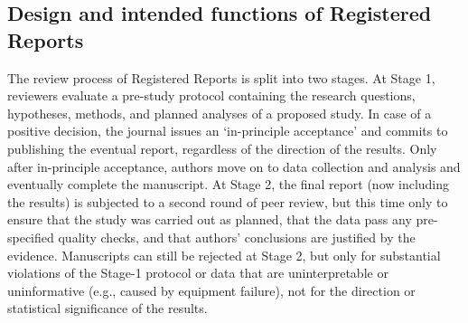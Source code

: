 \documentclass[
  ,man,mask,floatsintext]{apa6}
\begin{document}
\hypertarget{design-and-intended-functions-of-registered-reports}{%
\subsection{Design and intended functions of Registered Reports}\label{design-and-intended-functions-of-registered-reports}}

The review process of Registered Reports is split into two stages.
At Stage 1, reviewers evaluate a pre-study protocol containing the research questions, hypotheses, methods, and planned analyses of a proposed study.
In case of a positive decision, the journal issues an `in-principle acceptance' and commits to publishing the eventual report, regardless of the direction of the results.
Only after in-principle acceptance, authors move on to data collection and analysis and eventually complete the manuscript.
At Stage 2, the final report (now including the results) is subjected to a second round of peer review, but this time only to ensure that the study was carried out as planned, that the data pass any pre-specified quality checks, and that authors' conclusions are justified by the evidence.
Manuscripts can still be rejected at Stage 2, but only for substantial violations of the Stage-1 protocol or data that are uninterpretable or uninformative (e.g., caused by equipment failure), not for the direction or statistical significance of the results.
\end{document}
